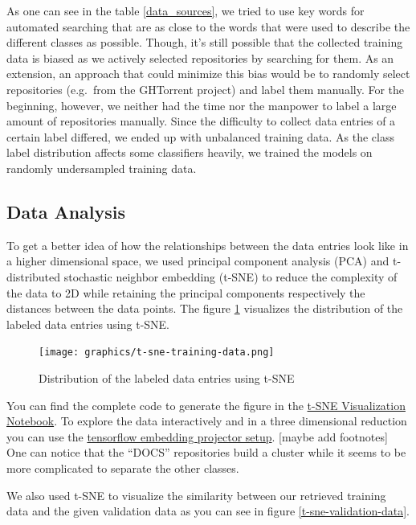\documentclass{article}
\begin{document}
As one can see in the table \ref{data_sources}, we tried to use key words for automated searching that
are as close to the words that were used to describe the different
classes as possible. Though, it's still possible that the collected
training data is biased as we actively selected repositories by
searching for them. As an extension, an approach that could minimize
this bias would be to randomly select repositories (e.g.~from the
GHTorrent project) and label them manually. For the beginning, however,
we neither had the time nor the manpower to label a large amount of
repositories manually. Since the difficulty to collect data entries of a
certain label differed, we ended up with unbalanced training data. As
the class label distribution affects some classifiers heavily, we
trained the models on randomly undersampled training data.

\subsection{Data Analysis}\label{data-analysis}

To get a better idea of how the relationships between the data entries
look like in a higher dimensional space, we used principal component
analysis (PCA) and t-distributed stochastic neighbor embedding (t-SNE)
to reduce the complexity of the data to 2D while retaining the principal
components respectively the distances between the data points. The 
figure \ref{t-sne-training-data} visualizes the distribution of the labeled data entries
using t-SNE.

\begin{figure}
	\centering
		\texttt{[image: graphics/t-sne-training-data.png]}
	\caption{Distribution of the labeled data entries using t-SNE}
	\label{t-sne-training-data}
\end{figure}

You can find the complete code to generate the figure in the
\href{https://github.com/WGierke/git_better/blob/master/t-SNE\%20Visualization.ipynb}{t-SNE
Visualization Notebook}. To explore the data interactively and in a
three dimensional reduction you can use the
\href{https://github.com/WGierke/git_better\#usage}{tensorflow embedding
projector setup}. {[}maybe add footnotes{]} One can notice that the
``DOCS'' repositories build a cluster while it seems to be more
complicated to separate the other classes.

We also used t-SNE to visualize the similarity between our retrieved
training data and the given validation data as you can see in figure \ref{t-sne-validation-data}.
\end{document}
